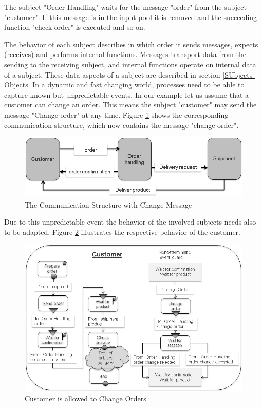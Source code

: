 The subject "Order Handling" waits for the message "order" from the subject "customer". If this message is in the input pool it is removed and the succeeding function "check order" is executed and so on.

The behavior of each subject describes in which order it sends messages, expects (receives) and performs internal functions. Messages transport data from the sending to the receiving subject, and internal functions operate on internal data of a subject. These data aspects of a subject are described in section \ref{SUbjects-Objects} In a dynamic and fast changing world, processes need to  be able to capture known but unpredictable events. In our example let us assume that a customer can change an order. This means the subject "customer" may send the message "Change order" at any time. Figure \ref{fig:ordercomstructure} shows the corresponding communication structure, which now contains the message "change order".
\newpage
\begin{figure}[ph]
	\centering
	\includegraphics[width=0.7\linewidth]{20181026-Ontologie-Bilder/Grafiken-Ontologie/SUbjectExecution/OrderComStructure}
	\caption[The Communication Structure with Change Message]{The Communication Structure with Change Message}
	\label{fig:ordercomstructure}
\end{figure}

Due to this unpredictable event the behavior of the involved subjects needs also to be adapted. Figure \ref{fig:ordercustomerchange} illustrates the respective behavior of the customer. 

\begin{figure}[ph]
	\centering
	\includegraphics[width=0.7\linewidth]{20181026-Ontologie-Bilder/Grafiken-Ontologie/SUbjectExecution/OrderCustomerChange}
	\caption[Customer is allowed to Change Orders]{Customer is allowed to Change Orders}
	\label{fig:ordercustomerchange}
\end{figure}



